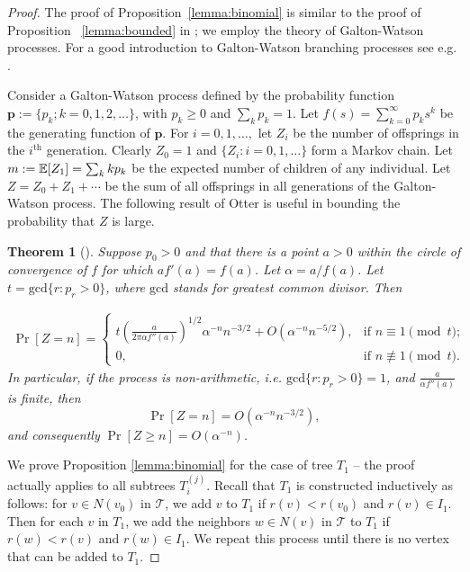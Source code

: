 \documentclass[english, oribibl]{llncs}
\newtheorem{theorem}{Theorem}[section]
\newcommand{\Exp}{\operatornamewithlimits{\mathbb{E}}}
\newcommand{\ith}[1]{{#1}^{\text{th}}}
\begin{document}
\begin{proof}
The proof of Proposition~\ref{lemma:binomial} is similar to the proof of Proposition ~\ref{lemma:bounded} in \cite{ARV+11};
we employ the theory of Galton-Watson processes.
For a good introduction to Galton-Watson branching processes see e.g. \cite{Har63}.

Consider a Galton-Watson process defined by the probability function
$\mathbf{p}:=\{p_{k}; k=0,1,2, \ldots \}$, with $p_{k}\geq 0$ and $\sum_{k}p_{k}=1$.
Let $f(s)=\sum_{k=0}^{\infty}p_{k}s^{k}$
be the generating function of $\mathbf{p}$.
For $i=0, 1, \ldots,$ let $Z_{i}$ be the number of offsprings in the $\ith{i}$ generation.
Clearly $Z_{0}=1$ and $\{Z_{i}: i=0, 1, \ldots \}$ form a Markov chain.
Let $m:=\Exp[Z_{1}]=\sum_{k}kp_{k}$ be the expected number of children of any individual.
Let $Z=Z_{0}+Z_{1}+\cdots$ be the sum of all offsprings in all generations of the Galton-Watson process.
The following result of Otter is useful in bounding the probability that $Z$ is large.

\begin{theorem}[\cite{Ott49}]\label{thm:Otter}
Suppose $p_{0}>0$ and that there is a point $a>0$ within the circle of convergence of $f$
for which $af'(a)=f(a)$. Let $\alpha=a/f(a)$.
Let $t=\mathrm{gcd}\{r: p_{r}>0\}$, where $\mathrm{gcd}$ stands for greatest common divisor.
Then

\begin{align*} \label{eqn:Otter}
\Pr[Z=n]=\begin{cases}
  t\left(\frac{a}{2\pi \alpha f''(a)} \right)^{1/2}\alpha^{-n}n^{-3/2} +O(\alpha^{-n}n^{-5/2}),
    &  \text{if $n \equiv 1 \pmod{t}$;} \\
  0, &  \text{if $n \not\equiv 1 \pmod{t}$.}
\end{cases}
\end{align*}
In particular, if the process is \emph{non-arithmetic}, i.e. $\mathrm{gcd}\{r: p_{r}>0\}=1$,
and $\frac{a}{\alpha f''(a)}$ is finite, then
\[
\Pr[Z=n]=O(\alpha^{-n}n^{-3/2}),
\]
and consequently $\Pr[Z\geq n]=O(\alpha^{-n})$.
\end{theorem}




We prove Proposition \ref{lemma:binomial} for the case of tree $T_{1}$ -- the proof actually applies
to all subtrees $T_i^{(j)}$.
Recall that $T_{1}$ is constructed inductively as follows:
for $v \in N(v_{0})$ in $\mathcal{T}$, we add $v$ to $T_{1}$ if
$r(v)<r(v_{0})$ and $r(v) \in I_{1}$.
Then for each $v$ in $T_{1}$, we add the neighbors $w \in N(v)$ in $\mathcal{T}$
to $T_{1}$ if $r(w)<r(v)$ and $r(w) \in I_{1}$.
We repeat this process until there is no vertex that can be added to $T_{1}$.



\end{proof}
\end{document}
